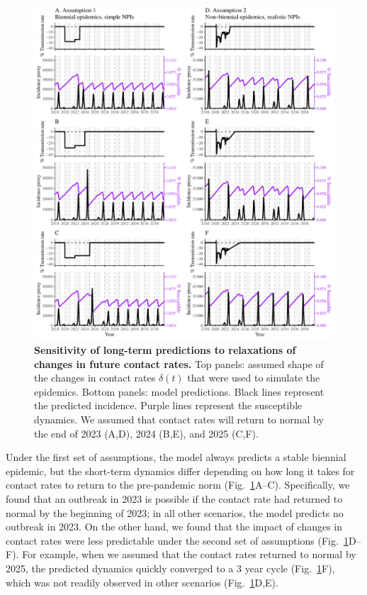 \documentclass[12pt]{article}
\newcommand{\fref}[1]{Fig.~\ref{fig:#1}}
\begin{document}
\begin{figure}[!th]
\includegraphics[width=\textwidth]{../figure_pub/figure3.pdf}
\caption{
\textbf{Sensitivity of long-term predictions to relaxations of changes in future contact rates.}
Top panels: assumed shape of the changes in contact rates $\delta(t)$ that were used to simulate the epidemics.
Bottom panels: model predictions.
Black lines represent the predicted incidence.
Purple lines represent the susceptible dynamics.
We assumed that contact rates will return to normal by the end of 2023 (A,D), 2024 (B,E), and 2025 (C,F).
}
\label{fig:fig3}
\end{figure}

Under the first set of assumptions, the model always predicts a stable biennial epidemic, but the short-term dynamics differ depending on how long it takes for contact rates to return to the pre-pandemic norm (\fref{fig3}A--C).
Specifically, we found that an outbreak in 2023 is possible if the contact rate had returned to normal by the beginning of 2023;
in all other scenarios, the model predicts no outbreak in 2023.
On the other hand, we found that the impact of changes in contact rates were less predictable under the second set of assumptions (\fref{fig3}D--F).
For example, when we assumed that the contact rates returned to normal by 2025, the predicted dynamics quickly converged to a 3 year cycle (\fref{fig3}F), which was not readily observed in other scenarios (\fref{fig3}D,E).
\end{document}
